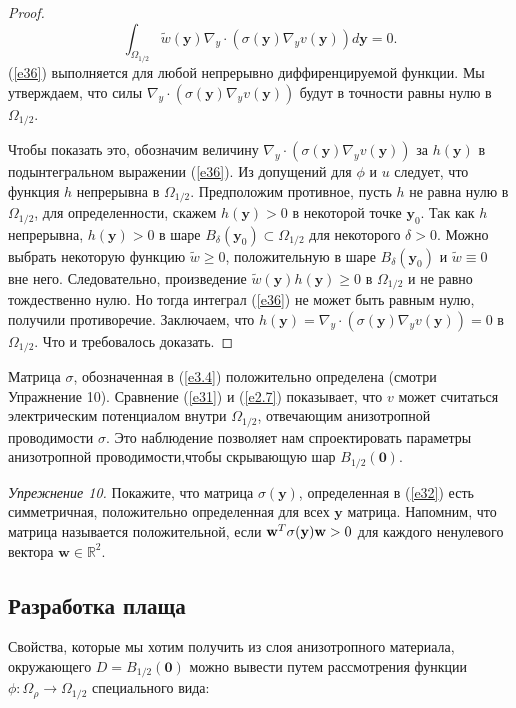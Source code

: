 \documentclass[a4paper, 12pt]{article}
\begin{document}
\begin{proof}
\begin{equation}\label{e36}
\int_{\Omega_{1/2}}{\tilde{w}(\textbf{y})\nabla_y \cdot (\sigma(\textbf{y})\nabla_y 
v(\textbf{y})) d\textbf{y}} =0.
\end{equation}
(\ref{e36}) выполняется для любой непрерывно диффиренцируемой функции. Мы утверждаем, 
что силы 
$\nabla_y \cdot (\sigma(\textbf{y})\nabla_y v(\textbf{y}))$ будут в точности равны 
нулю в $\Omega_{1/2}$.


Чтобы показать это, обозначим величину $\nabla_y \cdot (\sigma(\textbf{y})\nabla_y 
v(\textbf{y}))$ за
$h(\textbf{y})$ в подынтегральном выражении (\ref{e36}). Из допущений для $\phi$ и $u$ 
следует, 
что функция $h$ непрерывна в $\Omega_{1/2}$.
Предположим противное, пусть $h$ не равна нулю в $\Omega_{1/2}$, для определенности, 
скажем
$h(\textbf{y})>0$ в некоторой точке $\textbf{y}_0$. Так как $h$ непрерывна, 
$h(\textbf{y})>0$ в шаре
$B_{\delta}(\textbf{y}_0) \subset \Omega_{1/2}$ для некоторого $\delta > 0$.
Можно выбрать некоторую функцию $\tilde{w} \geq 0$, положительную в шаре $B_{\delta}
(\textbf{y}_0)$ и 
$\tilde{w} \equiv 0$ вне него. Следовательно, произведение $\tilde{w}
(\textbf{y})h(\textbf{y}) \geq 0$ в
$\Omega_{1/2}$ и не равно тождественно нулю. Но тогда интеграл (\ref{e36}) не может 
быть равным нулю,
получили противоречие. Заключаем, что $h(\textbf{y}) = \nabla_y \cdot 
(\sigma(\textbf{y})\nabla_y
v(\textbf{y})) = 0$ в $\Omega_{1/2}$. Что и требовалось доказать.
\end{proof}
Матрица $\sigma$, обозначенная в (\ref{e3.4}) положительно определена (смотри 
Упражнение 10).
Сравнение (\ref{e31}) и (\ref{e2.7}) показывает, что $v$ может считаться электрическим 
потенциалом внутри
$\Omega_{1/2}$, отвечающим анизотропной проводимости $\sigma$. Это наблюдение 
позволяет нам спроектировать
параметры анизотропной проводимости,чтобы скрывающую шар $B_{1/2}(\textbf{0})$.

\textit{Упрежнение 10.} Покажите, что матрица $\sigma(\textbf{y})$, определенная в 
(\ref{e32}) есть
симметричная, положительно определенная для всех $\textbf{y}$ матрица.   
Напомним, что матрица называется положительной, если 
$\textbf{w}^T\sigma(\textbf{\textbf{y}})\textbf{w}>0$
для каждого ненулевого вектора $\textbf{w} \in \mathbb{R}^2$.

\subsection{Разработка плаща}
Свойства, которые мы хотим получить из слоя анизотропного материала, окружающего $D = 
B_{1/2}(\textbf{0})$
можно вывести путем рассмотрения функции $\phi: \Omega_{\rho} \to \Omega_{1/2}$ 
специального вида:
\end{document}
